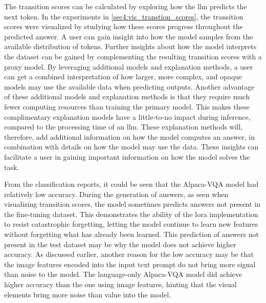 The transition scores can be calculated by exploring how the \gls{llm} predicts the next token. In the experiments in \autoref{sec4:vis_transtion_scores}, the transition scores were visualized by studying how these scores progress throughout the predicted answer. A user can gain insight into how the model samples from the available distribution of tokens. Further insights about how the model interprets the dataset can be gained by complementing the resulting transition scores with a proxy model. %
By leveraging additional models and explanation methods, a user can get a combined interpretation of how larger, more complex, and opaque models may use the available data when predicting outputs.
Another advantage of these additional models and explanation methods is that they require much fewer computing resources than training the primary model. 
This makes these complimentary explanation models have a little-to-no impact during inference, compared to the processing time of an \gls{llm}. 
These explanation methods will, therefore, add additional information on how the model computes an answer, in combination with details on how the model may use the data. These insights can facilitate a user in gaining important information on how the model solves the task.

From the classification reports, it could be seen that the Alpaca-VQA model had relatively low accuracy. During the generation of answers, as seen when visualizing transition scores, the model sometimes predicts answers not present in the fine-tuning dataset. This demonstrates the ability of the \gls{lora} implementation to resist catastrophic forgetting, letting the model continue to learn new features without forgetting what has already been learned. 
This prediction of answers not present in the test dataset may be why the model does not achieve higher accuracy. As discussed earlier, another reason for the low accuracy may be that the image features encoded into the input text prompt do not bring more signal than noise to the model. The language-only Alpaca-VQA model did achieve higher accuracy than the one using image features, hinting that the visual elements bring more noise than value into the model. 


